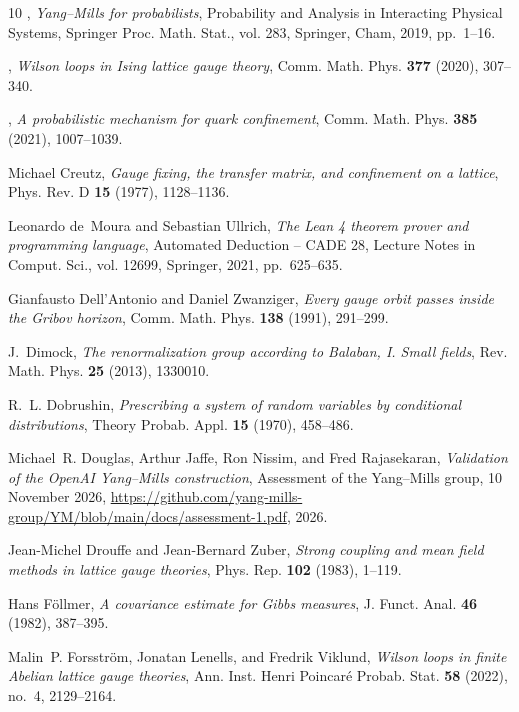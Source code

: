 \documentclass[11pt,a4paper]{amsart}
\theoremstyle{definition}
\theoremstyle{remark}
\numberwithin{equation}{section}
\begin{document}
\begin{thebibliography}{10}
\bysame, \emph{{Y}ang--{M}ills for probabilists}, Probability and Analysis in
  Interacting Physical Systems, Springer Proc. Math. Stat., vol. 283, Springer,
  Cham, 2019, pp.~1--16.

\bysame, \emph{Wilson loops in {I}sing lattice gauge theory}, Comm. Math. Phys.
  \textbf{377} (2020), 307--340.

\bysame, \emph{A probabilistic mechanism for quark confinement}, Comm. Math.
  Phys. \textbf{385} (2021), 1007--1039.

Michael Creutz, \emph{Gauge fixing, the transfer matrix, and confinement on a
  lattice}, Phys. Rev. D \textbf{15} (1977), 1128--1136.

Leonardo de~Moura and Sebastian Ullrich, \emph{The {L}ean 4 theorem prover and
  programming language}, Automated Deduction -- {CADE} 28, Lecture Notes in
  Comput. Sci., vol. 12699, Springer, 2021, pp.~625--635.

Gianfausto Dell'Antonio and Daniel Zwanziger, \emph{Every gauge orbit passes
  inside the {G}ribov horizon}, Comm. Math. Phys. \textbf{138} (1991),
  291--299.

J.~Dimock, \emph{The renormalization group according to {B}alaban, {I}. {S}mall
  fields}, Rev. Math. Phys. \textbf{25} (2013), 1330010.

R.~L. Dobrushin, \emph{Prescribing a system of random variables by conditional
  distributions}, Theory Probab. Appl. \textbf{15} (1970), 458--486.

Michael~R. Douglas, Arthur Jaffe, Ron Nissim, and Fred Rajasekaran,
  \emph{Validation of the {OpenAI} {Y}ang--{M}ills construction}, Assessment of
  the {Y}ang--{M}ills group, 10 November 2026,
  \url{https://github.com/yang-mills-group/YM/blob/main/docs/assessment-1.pdf},
  2026.

Jean-Michel Drouffe and Jean-Bernard Zuber, \emph{Strong coupling and mean
  field methods in lattice gauge theories}, Phys. Rep. \textbf{102} (1983),
  1--119.

Hans F{\"o}llmer, \emph{A covariance estimate for {G}ibbs measures}, J. Funct.
  Anal. \textbf{46} (1982), 387--395.

Malin~P. Forsstr{\"o}m, Jonatan Lenells, and Fredrik Viklund, \emph{Wilson
  loops in finite {A}belian lattice gauge theories}, Ann. Inst. Henri
  Poincar\'e Probab. Stat. \textbf{58} (2022), no.~4, 2129--2164.


\end{thebibliography}
\end{document}
